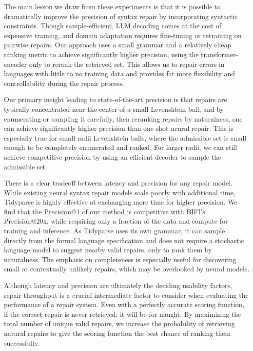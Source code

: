 \documentclass[sigplan,review,acmsmall,nonacm,screen,anonymous]{acmart}\settopmatter{printfolios=false,printccs=false,printacmref=false}
\begin{document}
The main lesson we draw from these experiments is that it is possible to dramatically improve the precision of syntax repair by incorporating syntactic constraints. Though sample-efficient, LLM decoding comes at the cost of expensive training, and domain adaptation requires fine-tuning or retraining on pairwise repairs. Our approach uses a small grammar and a relatively cheap ranking metric to achieve significantly higher precision, using the transformer-encoder only to rerank the retrieved set. This allows us to repair errors in languages with little to no training data and provides far more flexibility and controllability during the repair process.

Our primary insight leading to state-of-the-art precision is that repairs are typically concentrated near the center of a small Levenshtein ball, and by enumerating or sampling it carefully, then reranking repairs by naturalness, one can achieve significantly higher precision than one-shot neural repair. This is especially true for small-radii Levenshtein balls, where the admissible set is small enough to be completely enumerated and ranked. For larger radii, we can still achieve competitive precision by using an efficient decoder to sample the admissible set.

There is a clear tradeoff between latency and precision for any repair model. While existing neural syntax repair models scale poorly with additional time, Tidyparse is highly effective at exchanging more time for higher precision. We find that the Precision@1 of our method is competitive with BIFI's Precision@20k, while requiring only a fraction of the data and compute for training and inference. As Tidyparse uses its own grammar, it can sample directly from the formal language specification and does not require a stochastic language model to suggest nearby valid repairs, only to rank them by naturalness. The emphasis on completeness is especially useful for discovering small or contextually unlikely repairs, which may be overlooked by neural models.

Although latency and precision are ultimately the deciding usability factors, repair throughput is a crucial intermediate factor to consider when evaluating the performance of a repair system. Even with a perfectly accurate scoring function, if the correct repair is never retrieved, it will be for naught. By maximizing the total number of unique valid repairs, we increase the probability of retrieving natural repairs to give the scoring function the best chance of ranking them successfully.
\end{document}
